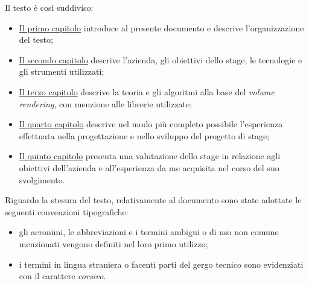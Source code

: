 Il testo è così suddiviso:
\begin{itemize}
    \item \hyperref[cap:introduzione]{Il primo capitolo} introduce al presente documento e descrive l'organizzazione del testo;
    \item \hyperref[cap:descrizione-stage]{Il secondo capitolo} descrive l'azienda, gli obiettivi dello stage, le tecnologie e gli strumenti utilizzati;
    \item \hyperref[cap:teoria-stage]{Il terzo capitolo} descrive la teoria e gli algoritmi alla base del \emph{volume rendering}, con menzione alle librerie utilizzate;
    \item \hyperref[cap:resoconto-stage]{Il quarto capitolo} descrive nel modo più completo possibile l'esperienza effettuata nella progettazione e nello sviluppo del progetto di stage;
	\item \hyperref[cap:conclusioni]{Il quinto capitolo} presenta una valutazione dello stage in relazione agli obiettivi dell'azienda e all'esperienza da me acquisita nel corso del suo svolgimento.
\end{itemize}


Riguardo la stesura del testo, relativamente al documento sono state adottate le seguenti convenzioni tipografiche:
\begin{itemize}
	\item gli acronimi, le abbreviazioni e i termini ambigui o di uso non comune menzionati vengono definiti nel loro primo utilizzo;
	\item i termini in lingua straniera o facenti parti del gergo tecnico sono evidenziati con il carattere \emph{corsivo}.
\end{itemize}